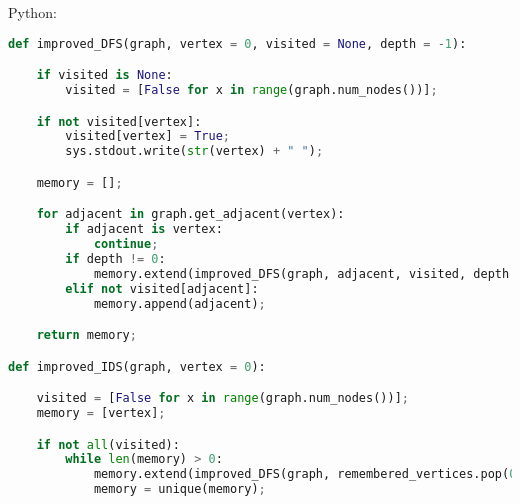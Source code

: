 Python:
\begin{lstlisting}[language=Python]
def improved_DFS(graph, vertex = 0, visited = None, depth = -1):

    if visited is None:
        visited = [False for x in range(graph.num_nodes())];

    if not visited[vertex]:
        visited[vertex] = True;
        sys.stdout.write(str(vertex) + " ");

    memory = [];

    for adjacent in graph.get_adjacent(vertex):
        if adjacent is vertex:
            continue;
        if depth != 0:
            memory.extend(improved_DFS(graph, adjacent, visited, depth - 1));
        elif not visited[adjacent]:
            memory.append(adjacent);

    return memory;

def improved_IDS(graph, vertex = 0):

    visited = [False for x in range(graph.num_nodes())];
    memory = [vertex];

    if not all(visited):
        while len(memory) > 0:
            memory.extend(improved_DFS(graph, remembered_vertices.pop(0), visited, 0));
            memory = unique(memory);
\end{lstlisting}